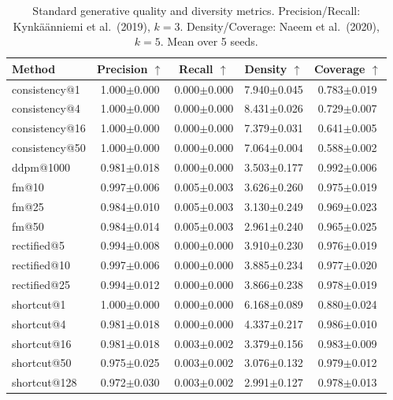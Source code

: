 \begin{table}[t]
\centering
\caption{Standard generative quality and diversity metrics. Precision/Recall: Kynk\"a\"anniemi et al.\ (2019), $k{=}3$. Density/Coverage: Naeem et al.\ (2020), $k{=}5$. Mean over 5 seeds.}
\label{tab:precision_recall}
\footnotesize
\begin{tabular}{lcccc}
\toprule
Method & Precision $\uparrow$ & Recall $\uparrow$ & Density $\uparrow$ & Coverage $\uparrow$ \\
\midrule
  consistency@1 & 1.000$\pm$0.000 & 0.000$\pm$0.000 & 7.940$\pm$0.045 & 0.783$\pm$0.019 \\
  consistency@4 & 1.000$\pm$0.000 & 0.000$\pm$0.000 & 8.431$\pm$0.026 & 0.729$\pm$0.007 \\
  consistency@16 & 1.000$\pm$0.000 & 0.000$\pm$0.000 & 7.379$\pm$0.031 & 0.641$\pm$0.005 \\
  consistency@50 & 1.000$\pm$0.000 & 0.000$\pm$0.000 & 7.064$\pm$0.004 & 0.588$\pm$0.002 \\
  ddpm@1000 & 0.981$\pm$0.018 & 0.000$\pm$0.000 & 3.503$\pm$0.177 & 0.992$\pm$0.006 \\
  fm@10 & 0.997$\pm$0.006 & 0.005$\pm$0.003 & 3.626$\pm$0.260 & 0.975$\pm$0.019 \\
  fm@25 & 0.984$\pm$0.010 & 0.005$\pm$0.003 & 3.130$\pm$0.249 & 0.969$\pm$0.023 \\
  fm@50 & 0.984$\pm$0.014 & 0.005$\pm$0.003 & 2.961$\pm$0.240 & 0.965$\pm$0.025 \\
  rectified@5 & 0.994$\pm$0.008 & 0.000$\pm$0.000 & 3.910$\pm$0.230 & 0.976$\pm$0.019 \\
  rectified@10 & 0.997$\pm$0.006 & 0.000$\pm$0.000 & 3.885$\pm$0.234 & 0.977$\pm$0.020 \\
  rectified@25 & 0.994$\pm$0.012 & 0.000$\pm$0.000 & 3.866$\pm$0.238 & 0.978$\pm$0.019 \\
  shortcut@1 & 1.000$\pm$0.000 & 0.000$\pm$0.000 & 6.168$\pm$0.089 & 0.880$\pm$0.024 \\
  shortcut@4 & 0.981$\pm$0.018 & 0.000$\pm$0.000 & 4.337$\pm$0.217 & 0.986$\pm$0.010 \\
  shortcut@16 & 0.981$\pm$0.018 & 0.003$\pm$0.002 & 3.379$\pm$0.156 & 0.983$\pm$0.009 \\
  shortcut@50 & 0.975$\pm$0.025 & 0.003$\pm$0.002 & 3.076$\pm$0.132 & 0.979$\pm$0.012 \\
  shortcut@128 & 0.972$\pm$0.030 & 0.003$\pm$0.002 & 2.991$\pm$0.127 & 0.978$\pm$0.013 \\
\bottomrule
\end{tabular}
\end{table}
